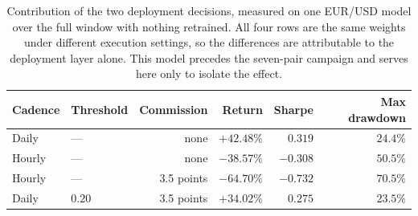 \begin{table}[htb!]
\centering
\footnotesize
\begin{tabular}{@{}llrrrr@{}}
\toprule
\textbf{Cadence} & \textbf{Threshold} & \textbf{Commission} & \textbf{Return} & \textbf{Sharpe} & \textbf{Max drawdown} \\
\midrule
Daily & --- & none & $+42.48\%$ & $0.319$ & $24.4\%$ \\
Hourly & --- & none & $-38.57\%$ & $-0.308$ & $50.5\%$ \\
Hourly & --- & 3.5 points & $-64.70\%$ & $-0.732$ & $70.5\%$ \\
Daily & $0.20$ & 3.5 points & $+34.02\%$ & $0.275$ & $23.5\%$ \\
\bottomrule
\end{tabular}
\caption{Contribution of the two deployment decisions, measured on one EUR/USD model over the full window with nothing retrained. All four rows are the same weights under different execution settings, so the differences are attributable to the deployment layer alone. This model precedes the seven-pair campaign and serves here only to isolate the effect.}
\label{Tables:Deployment}
\end{table}